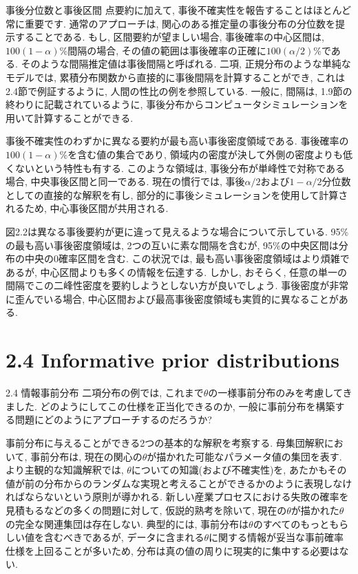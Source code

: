 \documentclass[10pt,dvipdfmx,a4]{beamer}
\begin{document}
\begin{frame}{事後分位数と事後区間}
点要約に加えて, 事後不確実性を報告することはほとんど常に重要です.
通常のアプローチは, 関心のある推定量の事後分布の分位数を提示することである.
もし, 区間要約が望ましい場合, 事後確率の中心区間は, $100(1-\alpha)$\%間隔の場合,  その値の範囲は事後確率の正確に$100(\alpha/2)$\%である.
そのような間隔推定値は事後間隔と呼ばれる.
二項, 正規分布のような単純なモデルでは, 累積分布関数から直接的に事後間隔を計算することができ, これは2.4節で例証するように, 人間の性比の例を参照している.
一般に, 間隔は, 1.9節の終わりに記載されているように, 事後分布からコンピュータシミュレーションを用いて計算することができる.

事後不確実性のわずかに異なる要約が最も高い事後密度領域である.
事後確率の$100(1-\alpha)$\%を含む値の集合であり, 領域内の密度が決して外側の密度よりも低くないという特性も有する.
このような領域は, 事後分布が単峰性で対称である場合, 中央事後区間と同一である.
現在の慣行では, 事後$\alpha/2$および$1-\alpha/2$分位数としての直接的な解釈を有し, 部分的に事後シミュレーションを使用して計算されるため, 中心事後区間が共用される.
\end{frame}


\begin{frame}
図2.2は異なる事後要約が更に違って見えるような場合について示している.
95\%の最も高い事後密度領域は, 2つの互いに素な間隔を含むが, 95\%の中央区間は分布の中央の0確率区間を含む.
この状況では, 最も高い事後密度領域はより煩雑であるが, 中心区間よりも多くの情報を伝達する.
しかし, おそらく, 任意の単一の間隔でこの二峰性密度を要約しようとしない方が良いでしょう.
事後密度が非常に歪んでいる場合, 中心区間および最高事後密度領域も実質的に異なることがある.
\end{frame}

\section{2.4 Informative prior distributions}
\begin{frame}{2.4 情報事前分布}
二項分布の例では, これまで$\theta$の一様事前分布のみを考慮してきました.
どのようにしてこの仕様を正当化できるのか, 一般に事前分布を構築する問題にどのようにアプローチするのだろうか?

事前分布に与えることができる2つの基本的な解釈を考察する.
母集団解釈において, 事前分布は, 現在の関心の$\theta$が描かれた可能なパラメータ値の集団を表す.
より主観的な知識解釈では, $\theta$についての知識(および不確実性)を, あたかもその値が前の分布からのランダムな実現と考えることができるかのように表現しなければならないという原則が導かれる.
新しい産業プロセスにおける失敗の確率を見積もるなどの多くの問題に対して, 仮説的熟考を除いて, 現在の$\theta$が描かれた$\theta$の完全な関連集団は存在しない.
典型的には, 事前分布は$\theta$のすべてのもっともらしい値を含むべきであるが, データに含まれる$\theta$に関する情報が妥当な事前確率仕様を上回ることが多いため, 分布は真の値の周りに現実的に集中する必要はない.
\end{frame}
\end{document}
